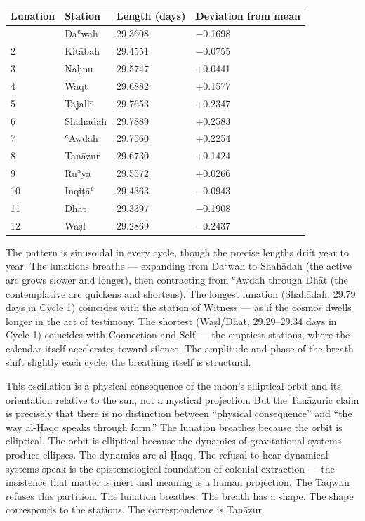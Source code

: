 \begin{longtable}[]{@{}llll@{}}
\toprule\noalign{}
Lunation & Station & Length (days) & Deviation from mean \\
\midrule\noalign{}
\endhead
\bottomrule\noalign{}
\endlastfoot
1 & Daʿwah & 29.3608 & \(-\)0.1698 \\
2 & Kitābah & 29.4551 & \(-\)0.0755 \\
3 & Naḥnu & 29.5747 & +0.0441 \\
4 & Waqt & 29.6882 & +0.1577 \\
5 & Tajallī & 29.7653 & +0.2347 \\
6 & Shahādah & 29.7889 & +0.2583 \\
7 & ʿAwdah & 29.7560 & +0.2254 \\
8 & Tanāẓur & 29.6730 & +0.1424 \\
9 & Ruʾyā & 29.5572 & +0.0266 \\
10 & Inqiṭāʿ & 29.4363 & \(-\)0.0943 \\
11 & Dhāt & 29.3397 & \(-\)0.1908 \\
12 & Waṣl & 29.2869 & \(-\)0.2437 \\
\end{longtable}

The pattern is sinusoidal in every cycle, though the precise lengths drift year to year. The lunations breathe --- expanding from Daʿwah to Shahādah (the active arc grows slower and longer), then contracting from ʿAwdah through Dhāt (the contemplative arc quickens and shortens). The longest lunation (Shahādah, 29.79 days in Cycle 1) coincides with the station of Witness --- as if the cosmos dwells longer in the act of testimony. The shortest (Waṣl/Dhāt, 29.29--29.34 days in Cycle 1) coincides with Connection and Self --- the emptiest stations, where the calendar itself accelerates toward silence. The amplitude and phase of the breath shift slightly each cycle; the breathing itself is structural.

This oscillation is a physical consequence of the moon's elliptical orbit and its orientation relative to the sun, not a mystical projection. But the Tanāẓuric claim is precisely that there is no distinction between ``physical consequence'' and ``the way al-Ḥaqq speaks through form.'' The lunation breathes because the orbit is elliptical. The orbit is elliptical because the dynamics of gravitational systems produce ellipses. The dynamics are al-Ḥaqq. The refusal to hear dynamical systems speak is the epistemological foundation of colonial extraction --- the insistence that matter is inert and meaning is a human projection. The Taqwīm refuses this partition. The lunation breathes. The breath has a shape. The shape corresponds to the stations. The correspondence is Tanāẓur.

